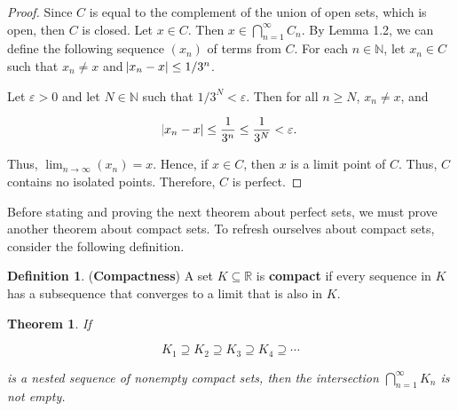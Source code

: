 \documentclass{article}
\newtheorem{theorem}{Theorem}[section]
\theoremstyle{definition}
\newtheorem{definition}{Definition}[section]
\theoremstyle{remark}
\theoremstyle{definition}
\begin{document}
\begin{proof}
    Since $C$ is equal to the complement of the union of open sets, which is open, then $C$ is closed. Let $x\in C$. Then $x\in \bigcap_{n=1}^{\infty}C_n$. By Lemma 1.2, we can define the following sequence $(x_n)$ of terms from $C$. For each $n\in\mathbb{N}$, let $x_n\in C$ such that $x_n\neq x$ and $\abs{x_n-x}\leq 1/3^n$.\par
    Let $\varepsilon>0$ and let $N\in\mathbb{N}$ such that $1/3^N<\varepsilon$. Then for all $n\geq N$, $x_n\neq x$, and  
        
    \begin{equation*}
        \abs{x_n-x}\leq \frac{1}{3^n}\leq\frac{1}{3^N}<\varepsilon.
    \end{equation*}
        
    \noindent Thus, $\lim_{n\rightarrow\infty}(x_n)=x$. Hence, if $x\in C$, then $x$ is a limit point of $C$. Thus, $C$ contains no isolated points. Therefore, $C$ is perfect.
\end{proof}
    
\newpage
    
\noindent Before stating and proving the next theorem about perfect sets, we must prove another theorem about compact sets. To refresh ourselves about compact sets, consider the following definition.
    
\begin{definition}
    (\textbf{Compactness}) A set $K\subseteq\mathbb{R}$ is \textbf{compact} if every sequence in $K$ has a subsequence that converges to a limit that is also in $K$.
\end{definition}
    
\begin{theorem}
     \textit{If}
        
    \begin{equation*}
        K_1\supseteq K_2\supseteq K_3\supseteq K_4\supseteq\cdots 
    \end{equation*}
        
    \noindent \textit{is a nested sequence of nonempty compact sets, then the intersection $\bigcap_{n=1}^{\infty} K_n$ is not empty.}
\end{theorem}
    
\end{document}
